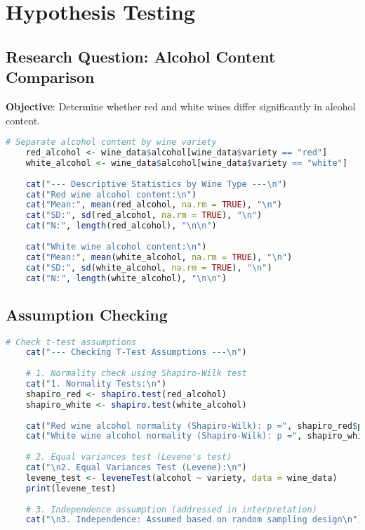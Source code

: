 \section{Hypothesis Testing}

\subsection{Research Question: Alcohol Content Comparison}

\textbf{Objective}: Determine whether red and white wines differ significantly in alcohol content.

\begin{lstlisting}[language=R, caption=Alcohol Content Analysis by Wine Type]
	# Separate alcohol content by wine variety
	red_alcohol <- wine_data$alcohol[wine_data$variety == "red"]
	white_alcohol <- wine_data$alcohol[wine_data$variety == "white"]
	
	cat("--- Descriptive Statistics by Wine Type ---\n")
	cat("Red wine alcohol content:\n")
	cat("Mean:", mean(red_alcohol, na.rm = TRUE), "\n")
	cat("SD:", sd(red_alcohol, na.rm = TRUE), "\n")
	cat("N:", length(red_alcohol), "\n\n")
	
	cat("White wine alcohol content:\n")
	cat("Mean:", mean(white_alcohol, na.rm = TRUE), "\n")
	cat("SD:", sd(white_alcohol, na.rm = TRUE), "\n")
	cat("N:", length(white_alcohol), "\n\n")
\end{lstlisting}

\subsection{Assumption Checking}

\begin{lstlisting}[language=R, caption=T-Test Assumption Testing]
	# Check t-test assumptions
	cat("--- Checking T-Test Assumptions ---\n")
	
	# 1. Normality check using Shapiro-Wilk test
	cat("1. Normality Tests:\n")
	shapiro_red <- shapiro.test(red_alcohol)
	shapiro_white <- shapiro.test(white_alcohol)
	
	cat("Red wine alcohol normality (Shapiro-Wilk): p =", shapiro_red$p.value, "\n")
	cat("White wine alcohol normality (Shapiro-Wilk): p =", shapiro_white$p.value, "\n")
	
	# 2. Equal variances test (Levene's test)
	cat("\n2. Equal Variances Test (Levene):\n")
	levene_test <- leveneTest(alcohol ~ variety, data = wine_data)
	print(levene_test)
	
	# 3. Independence assumption (addressed in interpretation)
	cat("\n3. Independence: Assumed based on random sampling design\n")
\end{lstlisting}

